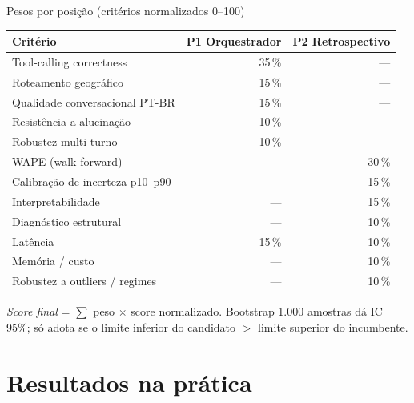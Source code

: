 \documentclass[10pt,aspectratio=169]{beamer}
\begin{document}
\begin{frame}{Pesos por posição (critérios normalizados 0--100)}
\centering\small
\begin{tabularx}{0.86\textwidth}{@{}X r r@{}}
\toprule
\textbf{Critério} & \textbf{P1 Orquestrador} & \textbf{P2 Retrospectivo} \\
\midrule
Tool-calling correctness        & 35\,\% & --- \\
Roteamento geográfico           & 15\,\% & --- \\
Qualidade conversacional PT-BR  & 15\,\% & --- \\
Resistência a alucinação        & 10\,\% & --- \\
Robustez multi-turno            & 10\,\% & --- \\
WAPE (walk-forward)             & ---    & 30\,\% \\
Calibração de incerteza p10--p90 & ---    & 15\,\% \\
Interpretabilidade              & ---    & 15\,\% \\
Diagnóstico estrutural          & ---    & 10\,\% \\
Latência                        & 15\,\% & 10\,\% \\
Memória / custo                 & ---    & 10\,\% \\
Robustez a outliers / regimes   & ---    & 10\,\% \\
\bottomrule
\end{tabularx}

\vspace{0.4em}
\footnotesize
\emph{Score final} = $\sum$ peso $\times$ score normalizado. Bootstrap
1.000 amostras dá IC 95\%; só adota se o limite inferior do candidato
$>$ limite superior do incumbente.
\end{frame}

\section{Resultados na prática}
\end{document}
